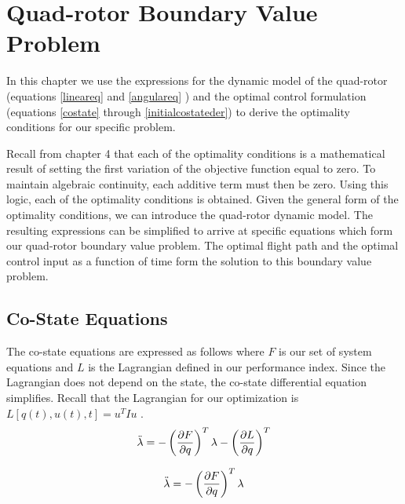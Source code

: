 
\chapter{Quad-rotor Boundary Value Problem} %

\label{Chapter5}


In this chapter we use the expressions for the dynamic model of the quad-rotor (equations \ref{lineareq} and \ref{angulareq} ) and the optimal control formulation (equations \ref{costate} through \ref{initialcostateder}) to derive the optimality conditions for our specific problem.

Recall from chapter 4 that each of the optimality conditions is a mathematical result of setting the first variation of the objective function equal to zero. To maintain algebraic continuity, each additive term must then be zero. Using this logic, each of the optimality conditions is obtained. Given the general form of the optimality conditions, we can introduce the quad-rotor dynamic model. The resulting expressions can be simplified to arrive at specific equations which form our quad-rotor boundary value problem. The optimal flight path and the optimal control input as a function of time form the solution to this boundary value problem.


\section{Co-State Equations}


The co-state equations are expressed as follows where $F$ is our set of system equations and $L$ is the Lagrangian defined in our performance index. Since the Lagrangian does not depend on the state, the co-state differential equation simplifies. Recall that the Lagrangian for our optimization is $ L[q(t),u(t),t] = u^T I u $ .
\begin{equation}
    \ddot{\lambda} = -\left(\frac{\partial F}{\partial q}\right)^T \lambda - \left(\frac{\partial L}{\partial q}\right)^T
\end{equation}

\begin{equation}
    \ddot{\lambda} = -\left(\frac{\partial F}{\partial q}\right)^T \lambda
\end{equation}


